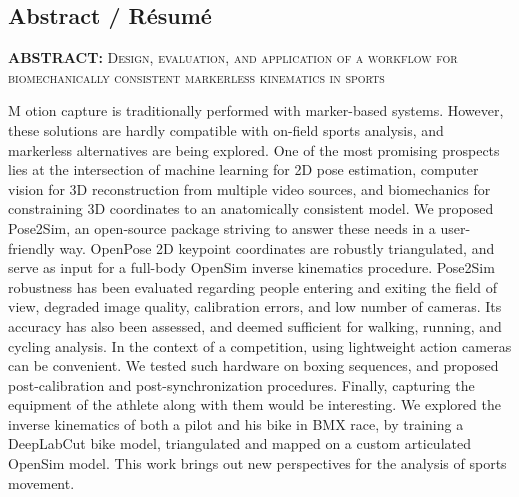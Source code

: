 {}

\vspace*{-1.6cm}
\begin{flushright}
\section*{\fontsize{20pt}{20pt}\selectfont\textnormal{Abstract / Résumé}}
\end{flushright}
\vspace{-.2cm}

\chead[\fancyplain{}{}]
      {\fancyplain{}{}}
\lfoot[\fancyplain{}{}]%
      {\fancyplain{}{}}
\cfoot[\fancyplain{}{\thepage}]
      {\fancyplain{}{\thepage}}
\rfoot[\fancyplain{}{}]%
     {\fancyplain{}{\scriptsize}}
     


\vspace*{1cm}

\noindent\textbf{ABSTRACT: } \textsc{Design, evaluation, and application of a workflow for biomechanically consistent markerless kinematics in sports}

\lettrine[lines=1]{M}{ }otion capture is traditionally performed with marker-based systems. However, these solutions are hardly compatible with on-field sports analysis, and markerless alternatives are being explored. One of the most promising prospects lies at the intersection of machine learning for 2D pose estimation, computer vision for 3D reconstruction from multiple video sources, and biomechanics for constraining 3D coordinates to an anatomically consistent model. We proposed Pose2Sim, an open-source package striving to answer these needs in a user-friendly way. OpenPose 2D keypoint coordinates are robustly triangulated, and serve as input for a full-body OpenSim inverse kinematics procedure. Pose2Sim robustness has been evaluated regarding people entering and exiting the field of view, degraded image quality, calibration errors, and low number of cameras. Its accuracy has also been assessed, and deemed sufficient for walking, running, and cycling analysis. In the context of a competition, using lightweight action cameras can be convenient. We tested such hardware on boxing sequences, and proposed post-calibration and post-synchronization procedures. Finally, capturing the equipment of the athlete along with them would be interesting. We explored the inverse kinematics of both a pilot and his bike in BMX race, by training a DeepLabCut bike model, triangulated and mapped on a custom articulated OpenSim model. This work brings out new perspectives for the analysis of sports movement.

